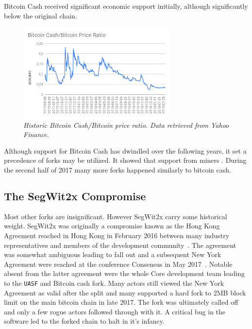 Bitcoin Cash received significant economic support initially, although significantly below the original chain.

\begin{figure}[!htb]
	\hspace*{-0.7cm} 
	\centering
	\includegraphics[width=8cm]{images/Bitcoin_Cash_Bitcoin_Price_Ratio.png}
	\caption{\textit{Historic Bitcoin Cash/Bitcoin price ratio. Data retrieved from Yahoo Finance.}}
	\label{fig:bch_btc}
	\hspace*{2mm} 	
\end{figure}

Although support for Bitcoin Cash has dwindled over the following years, it set a precedence of forks may be utilized. It showed that support from miners . During the second half of 2017 many more forks happened similarly to bitcoin cash.

\subsection{The SegWit2x Compromise}

Most other forks are insignificant. However SegWit2x carry some historical weight. SegWit2x was originally a compromise known as the Hong Kong Agreement reached in Hong Kong in February 2016 between many industry representatives and members of the development community~\cite{hong:kong:agreement}. The agreement was somewhat ambiguous leading to fall out and a subsequent New York Agreement were reached at the conference Consensus in May 2017~\cite{new:york:agreement}. Notable absent from the latter agreement were the whole Core development team leading to the \texttt{UASF} and Bitcoin cash fork. Many actors still viewed the New York Agreement as valid after the split and many supported a hard fork to 2MB block limit on the main bitcoin chain in late 2017. The fork was ultimately called off and only a few rogue actors followed through with it. A critical bug in the software led to the forked chain to halt in it's infancy. 

